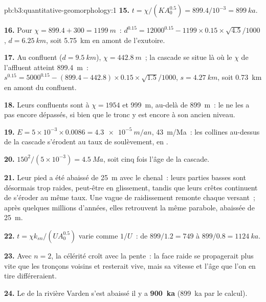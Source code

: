 \begin{solution}{pb:b3:quantitative-geomorphology:1}
\textbf{15.} $t = \chi/(KA_0^{0.5}) = 899.4/10^{-3} = \qty{899}{ka}$.

\textbf{16.} Pour $\chi = 899.4 + 300 = \qty{1199}{m}$~:
$d^{0.15} = 12000^{0.15} - 1199\times0.15\times\sqrt{4.5}/1000$, $d =
\qty{6.25}{km}$, soit \qty{5.75}{km} en amont de l'exutoire.

\textbf{17.} Au confluent ($d = \qty{9.5}{km}$), $\chi = \qty{442.8}{m}$~;
la cascade se situe là où le $\chi$ de l'affluent atteint \qty{899.4}{m}~:
$s^{0.15} = 5000^{0.15} - (899.4 - 442.8)\times0.15\times\sqrt{1.5}/1000$,
$s = \qty{4.27}{km}$, soit \qty{0.73}{km} en amont du confluent.

\textbf{18.} Leurs confluents sont à $\chi = 1954$ et \qty{999}{m}, au-delà de
\qty{899}{m}~: le  ne les a pas encore dépassés, si bien que le tronc
y est encore à son ancien niveau.

\textbf{19.} $E = 5\times10^{-3}\times0.0086 = \qty{4.3e-5}{m/an}$,
\qty{43}{m/Ma}~: les collines au-dessus de la cascade s'érodent au taux de soulèvement, en
.

\textbf{20.} $150^2/(5\times10^{-3}) = \qty{4.5}{Ma}$, soit cinq fois l'âge de
la cascade.

\textbf{21.} Leur pied a été abaissé de \qty{25}{m} avec le chenal~: leurs
parties basses sont désormais trop raides, peut-être en glissement, tandis que leurs
crêtes continuent de s'éroder au même taux. Une vague de raidissement remonte chaque versant~; après quelques
millions d'années, elles retrouvent la même parabole, abaissée de \qty{25}{m}.

\textbf{22.} $t = \chi k_{sn}/(U A_0^{0.5})$ varie comme $1/U$~: de
$899/1.2 = 749$ à $899/0.8 = \qty{1124}{ka}$.

\textbf{23.} Avec $n = 2$, la célérité croît avec la pente~: la face raide
se propagerait plus vite que les tronçons voisins et resterait vive, mais
sa vitesse et l'âge que l'on en tire différeraient.

\textbf{24.} Le  de la rivière Varden s'est abaissé
il y a \textbf{\qty[text-series-to-math=true]{900}{ka}} (\qty{899}{ka} par le
calcul).
\end{solution}

